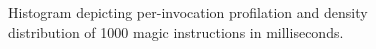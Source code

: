 
\begin{figure}
	\centering
	

	\caption{Histogram depicting per-invocation profilation and density distribution of 1000 magic instructions in milliseconds.}
	\label{fig:histogrammagicinstructions}
\end{figure}